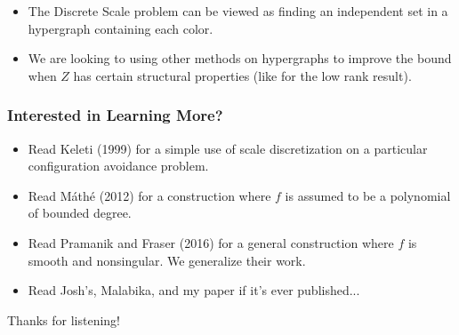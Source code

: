 \documentclass[usenames,dvipsnames]{beamer}
\begin{document}
\begin{frame}
\begin{figure}
\begin{subfigure}{.4\textwidth}
        \end{subfigure}
    \end{figure}

    \begin{itemize}
        \pause
        \pause
        \pause
        \pause
        \item The Discrete Scale problem can be viewed as finding an independent set in a hypergraph containing each color.

        \pause
        \item We are looking to using other methods on hypergraphs to improve the bound when $Z$ has certain structural properties (like for the low rank result).
    \end{itemize}
\end{frame}

\begin{frame}
    \frametitle{Interested in Learning More?}

    \begin{itemize}
            \item Read Keleti (1999) for a simple use of scale discretization on a particular configuration avoidance problem.
            \pause
            \item Read M\'{a}th\'{e} (2012) for a construction where $f$ is assumed to be a polynomial of bounded degree.
            \pause
            \item Read Pramanik and Fraser (2016) for a general construction where $f$ is smooth and nonsingular. We generalize their work.
            \pause
            \item Read Josh's, Malabika, and my paper if it's ever published...
    \end{itemize}

    Thanks for listening!
\end{frame}
\end{document}
